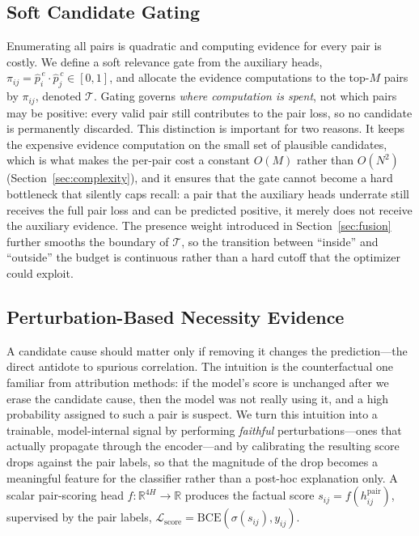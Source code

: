 \documentclass[journal]{IEEEtran}
\newcommand{\Real}{\mathbb{R}}
\begin{document}
\subsection{Soft Candidate Gating}
\label{sec:gate}
Enumerating all pairs is quadratic and computing evidence for every pair is costly. We
define a soft relevance gate from the auxiliary heads, $\pi_{ij}=\hat p^{\,e}_i\cdot\hat
p^{\,c}_j\in[0,1]$, and allocate the evidence computations to the top-$M$ pairs by
$\pi_{ij}$, denoted $\mathcal{T}$. Gating governs \emph{where computation is spent}, not
which pairs may be positive: every valid pair still contributes to the pair loss, so no
candidate is permanently discarded. This distinction is important for two reasons. It keeps
the expensive evidence computation on the small set of plausible candidates, which is what
makes the per-pair cost a constant $O(M)$ rather than $O(N^2)$ (Section~\ref{sec:complexity}),
and it ensures that the gate cannot become a hard bottleneck that silently caps recall: a pair
that the auxiliary heads underrate still receives the full pair loss and can be predicted
positive, it merely does not receive the auxiliary evidence. The presence weight introduced in
Section~\ref{sec:fusion} further smooths the boundary of $\mathcal{T}$, so the transition
between ``inside'' and ``outside'' the budget is continuous rather than a hard cutoff that the
optimizer could exploit.

\subsection{Perturbation-Based Necessity Evidence}
\label{sec:necessity}
A candidate cause should matter only if removing it changes the prediction---the direct
antidote to spurious correlation. The intuition is the counterfactual one familiar from
attribution methods: if the model's score is unchanged after we erase the candidate cause,
then the model was not really using it, and a high probability assigned to such a pair is
suspect. We turn this intuition into a trainable, model-internal signal by performing
\emph{faithful} perturbations---ones that actually propagate through the encoder---and by
calibrating the resulting score drops against the pair labels, so that the magnitude of the
drop becomes a meaningful feature for the classifier rather than a post-hoc explanation only.
A scalar pair-scoring head $f:\Real^{4H}\!\to\!\Real$
produces the factual score $s_{ij}=f(h_{ij}^{\mathrm{pair}})$, supervised by the pair
labels, $\mathcal{L}_{\mathrm{score}}=\mathrm{BCE}(\sigma(s_{ij}),y_{ij})$.
\end{document}
